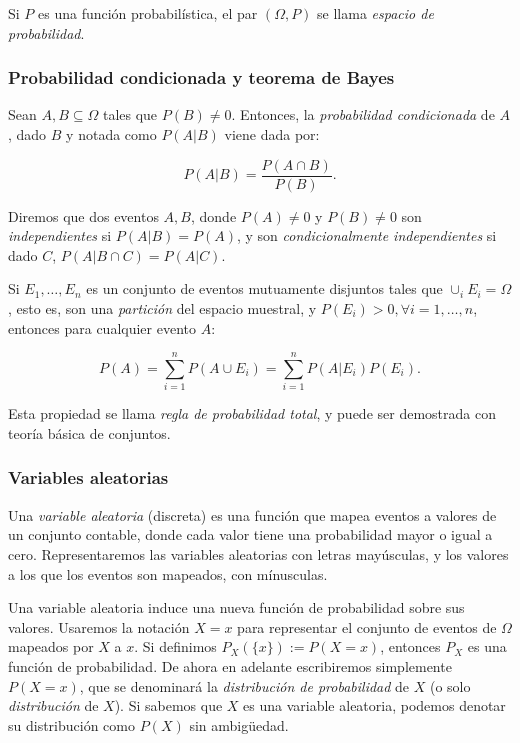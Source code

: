 Si $P$ es una función probabilística, el par $(\Omega, P)$ se llama {\em espacio de probabilidad}.

\subsubsection{Probabilidad condicionada y teorema de Bayes}\label{condi}

Sean $A, B \subseteq \Omega$ tales que $P(B) \neq 0$. Entonces, la {\em probabilidad condicionada} de $A$, 
dado $B$ y notada como $P(A|B)$ viene dada por:

$$P(A|B) = \frac{P(A \cap B)}{P(B)}.$$

Diremos que dos eventos $A,B$, donde $P(A) \neq 0$ y $P(B) \neq 0$ son {\em independientes} si $P(A|B) = P(A)$, 
y son {\em condicionalmente independientes} si dado $C$, $P(A|B \cap C) = P(A|C)$.

Si $E_1, \dots, E_n$ es un conjunto de eventos mutuamente disjuntos tales que $\cup_i E_i = \Omega$, esto es, 
son una {\em partición} del espacio muestral, y $P(E_i) > 0, \forall i = 1, \dots, n$, entonces para cualquier 
evento $A$: 

\begin{equation}
P(A) = \sum_{i=1}^n P(A \cup E_i) = \sum_{i=1}^n P(A|E_i)P(E_i). 
\label{lawoftotalprobability}
\end{equation}

Esta propiedad se llama {\em regla de probabilidad total}, y puede ser demostrada con teoría básica de conjuntos.

\subsubsection{Variables aleatorias}

Una {\em variable aleatoria} (discreta) es una función que mapea eventos a valores de un conjunto contable, donde 
cada valor tiene una probabilidad mayor o igual a cero. Representaremos las variables aleatorias con letras 
mayúsculas, y los valores a los que los eventos son mapeados, con mínusculas. 

Una variable aleatoria induce una nueva función de probabilidad sobre sus valores. Usaremos la notación $X=x$ para 
representar el conjunto de eventos de $\Omega$ mapeados por $X$ a $x$. Si definimos $P_X(\{x\}) := P(X=x)$, 
entonces $P_X$ es una función de probabilidad. De ahora en adelante escribiremos simplemente $P(X=x)$, que se 
denominará la {\em distribución de probabilidad} de $X$ (o solo {\em distribución} de $X$). Si sabemos que $X$ 
es una variable aleatoria, podemos denotar su distribución como $P(X)$ sin ambigüedad.

